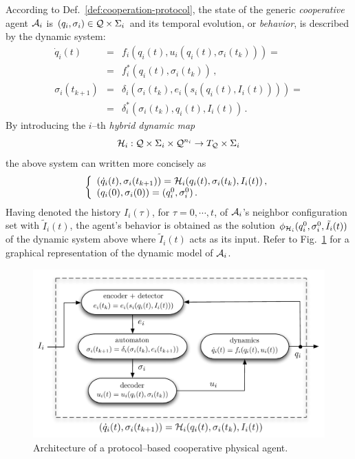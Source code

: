 \documentclass[journal, onecolumn, 12pt]{styles/IEEEtran}
\begin{document}
According to Def.~\ref{def:cooperation-protocol}, the state of the generic {\em cooperative} agent $\mathcal{A}_i$ is $(q_i, \sigma_i) \in \mathcal{Q} \times \Sigma_i$ and its temporal evolution, or {\em behavior}, is described by the dynamic system:
$$
\begin{array}{rcl}
\dot{q}_i(t) & = & f_i(q_i(t), u_i(q_i(t), \sigma_i(t_k))) = \\
& = & f^*_i(q_i(t), \sigma_i(t_k)) \, , \\
\sigma_i(t_{k+1}) & = & \delta_i(\sigma_i(t_k), e_i(s_i(q_i(t), I_i(t)))) = \\
& = & \delta^*_i(\sigma_i(t_k), q_i(t), I_i(t)) \, .
\end{array}
$$
By introducing the $i$--th {\em hybrid dynamic map} 
$$
\mathcal{H}_i : \mathcal{Q} \times \Sigma_i \times \mathcal{Q}^{n_i} \rightarrow T_{\mathcal{Q}} \times \Sigma_i 
$$ 
the above system can written more concisely as
\begin{equation}
\label{eq:cooperative-model}
\left\lbrace
\begin{array}{l}
(\dot{q}_i(t), \sigma_i(t_{k+1})) = \h_i(q_i(t), \sigma_i(t_k), I_i(t))  \, , \\
(q_i(0), \sigma_i(0)) = (q_i^0, \sigma_i^0) \, .
\end{array}
\right.
\end{equation}
Having denoted the history $I_i(\tau)$, for $\tau=0, \cdots, t$, of $\mathcal{A}_i$'s neighbor configuration set with $\tilde{I}_i(t)$, the agent's behavior is obtained as the solution $\phi_{\mathcal{H}_i}(q_i^0, \sigma_i^0, \tilde{I}_i(t))$ of the dynamic system above where $\tilde{I}_i(t)$ acts as its input. Refer to Fig.~\ref{fig:model-architecture} for a graphical representation of the dynamic model of $\mathcal{A}_i$.
%
\begin{figure}[!]
\centering
\includegraphics[width=\columnwidth,clip]{images/architecture-agent.pdf}
\caption{Architecture of a protocol--based cooperative physical agent.}
\label{fig:model-architecture}
\end{figure}
\end{document}
